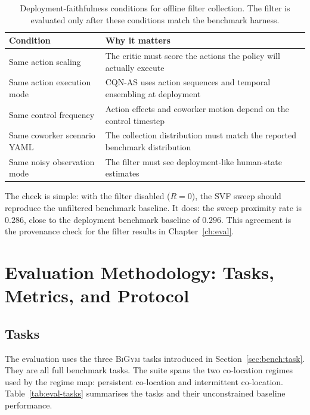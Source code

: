 \documentclass[11pt,a4paper]{report}
\newcommand{\bigym}{\textsc{BiGym}}
\newcommand{\cqnas}{CQN-AS}
\begin{document}
\begin{table}[htbp]
\centering
\small
\caption{Deployment-faithfulness conditions for offline filter
collection. The filter is evaluated only after these conditions match
the benchmark harness.}
\label{tab:deployment-faithful}
\begin{tabular}{ll}
\toprule
Condition & Why it matters \\
\midrule
Same action scaling & The critic must score the actions the policy will actually execute \\
Same action execution mode & \cqnas{} uses action sequences and temporal ensembling at deployment \\
Same control frequency & Action effects and coworker motion depend on the control timestep \\
Same coworker scenario YAML & The collection distribution must match the reported benchmark distribution \\
Same noisy observation mode & The filter must see deployment-like human-state estimates \\
\bottomrule
\end{tabular}
\end{table}

The check is simple: with the filter disabled ($R = 0$), the SVF sweep
should reproduce the unfiltered benchmark baseline. It does:
the sweep proximity rate is $0.286$, close to the deployment benchmark
baseline of $0.296$. This agreement is the provenance check for the
filter results in Chapter~\ref{ch:eval}.




\chapter{Evaluation Methodology: Tasks, Metrics, and Protocol}
\label{ch:protocol}

\section{Tasks}
\label{sec:setup:tasks}

The evaluation uses the three \bigym{} tasks introduced in
Section~\ref{sec:bench:task}. They are all full benchmark tasks. The
suite spans the two co-location regimes used by the regime map:
persistent co-location and intermittent co-location. Table~\ref{tab:eval-tasks}
summarises the tasks and their unconstrained baseline performance.
\end{document}
